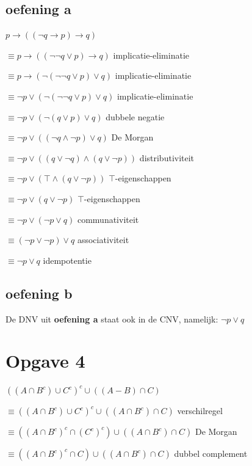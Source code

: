 \documentclass[11pt, a4paper]{article}
\begin{document}
\subsection*{oefening a}

$p \rightarrow ((\neg q \rightarrow p) \rightarrow q)$

$\equiv p \rightarrow ((\neg \neg q \lor p) \rightarrow q)$ \hfill implicatie-eliminatie

$\equiv p \rightarrow (\neg (\neg \neg q \lor p) \lor q)$ \hfill implicatie-eliminatie

$\equiv \neg p \lor (\neg (\neg \neg q \lor p) \lor q)$ \hfill implicatie-eliminatie

$\equiv \neg p \lor (\neg (q \lor p) \lor q)$ \hfill dubbele negatie

$\equiv \neg p \lor ((\neg q \land \neg p) \lor q)$ \hfill De Morgan

$\equiv \neg p \lor ((q \lor \neg q) \land (q \lor \neg p))$ \hfill distributiviteit

$\equiv \neg p \lor (\top \land (q \lor \neg p))$ \hfill $\top$-eigenschappen

$\equiv \neg p \lor (q \lor \neg p)$ \hfill $\top$-eigenschappen

$\equiv \neg p \lor (\neg p \lor q)$ \hfill communativiteit

$\equiv (\neg p \lor \neg p) \lor q$ \hfill associativiteit

$\boxed{\equiv \neg p \lor q}$ \hfill idempotentie


\subsection*{oefening b}

De DNV uit \textbf{oefening a} staat ook in de CNV, namelijk: $\boxed{\neg{p} \lor {q}}$



\pagebreak
\section*{Opgave 4}


${((A \cap B^c) \cup C^c)}^c \cup ((A-B) \cap C)$


$\equiv {((A \cap B^c) \cup C^c)}^c \cup ((A \cap B^c) \cap C)$ \hfill verschilregel

$\equiv {({(A \cap B^c)}^c \cap {(C^c)}^c)} \cup ((A \cap B^c) \cap C)$ \hfill De Morgan

$\equiv {({(A \cap B^c)}^c \cap C)} \cup ((A \cap B^c) \cap C)$ \hfill dubbel complement
\end{document}
